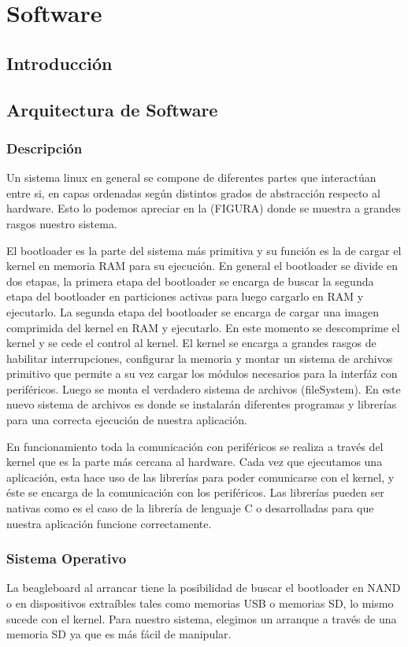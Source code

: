 \chapter{Software}

\section{Introducción}

\section{Arquitectura de Software}
\subsection{Descripción}
Un sistema linux en general se compone de diferentes partes que interactúan entre si, en capas  ordenadas según distintos grados de abstracción respecto al hardware. Esto lo podemos apreciar en la (FIGURA) donde se muestra a grandes rasgos nuestro sistema. 

El bootloader es la parte del sistema más primitiva y su función es la de cargar el kernel en memoria RAM para su ejecución. En general el bootloader se divide en dos etapas, la primera etapa del bootloader se encarga de buscar la segunda etapa del bootloader en particiones activas para luego cargarlo en RAM y ejecutarlo. La segunda etapa del bootloader se encarga de cargar una imagen comprimida del kernel en RAM y ejecutarlo. En este momento se descomprime el kernel y se cede el control al kernel.
El kernel se encarga a grandes rasgos de habilitar interrupciones, configurar la memoria y montar un sistema de archivos primitivo que permite a su vez cargar los módulos necesarios para la interfáz con periféricos. Luego se monta el verdadero sistema de archivos (fileSystem). En este nuevo sistema de archivos es donde se instalarán diferentes programas y librerías para una correcta ejecución de nuestra aplicación.

En funcionamiento toda la comunicación con periféricos se realiza a través del kernel que es la parte más cercana al hardware.
Cada vez que ejecutamos una aplicación, esta hace uso de las librerías para poder comunicarse con el kernel, y éste se encarga de la comunicación con los periféricos. Las librerías pueden ser nativas como es el caso de la librería de lenguaje C  o desarrolladas para que nuestra aplicación funcione correctamente.

\subsection{Sistema Operativo}
La beagleboard al arrancar tiene la posibilidad de buscar el bootloader en NAND o en dispositivos extraíbles tales como memorias USB o memorias SD, lo mismo sucede con el kernel. Para nuestro sistema, elegimos un arranque a través de una memoria SD ya que es más fácil de manipular.


